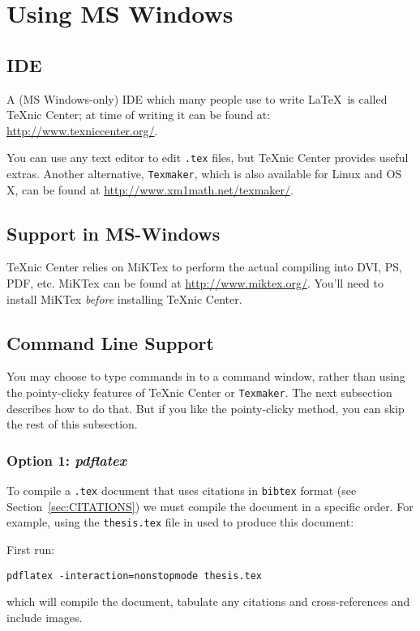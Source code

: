 \section{Using MS Windows}

\subsection{IDE}
A (MS Windows-only) IDE which many people use to write \LaTeX\ is
called TeXnic Center; at time of writing it can be found at:
\url{http://www.texniccenter.org/}.

You can use any text editor to edit \verb|.tex| files, but TeXnic Center
provides useful extras.
Another alternative, \verb|Texmaker|, which is also available for
Linux and OS X, can be found at \url{http://www.xm1math.net/texmaker/}.

\subsection{Support in MS-Windows}

TeXnic Center relies on MiKTex to perform the actual compiling
into DVI, PS, PDF, etc.  MiKTex can be found at
\url{http://www.miktex.org/}.
You'll need to install MiKTex \emph{before} installing TeXnic Center.

\subsection{Command Line Support}

You may choose to type commands in to a command window, rather than
using the pointy-clicky features of TeXnic Center or \verb|Texmaker|.
The next subsection describes how to do that.  But if you like the
pointy-clicky method, you can skip the rest of this subsection.

\subsubsection{Option 1: \emph{pdflatex}}

To compile a \verb|.tex| document that uses citations in \verb|bibtex|
format (see Section~\ref{sec:CITATIONS}) we must compile the document
in a specific order.  For example, using the \verb|thesis.tex| file in
used to produce this document:

First run:

\verb|pdflatex -interaction=nonstopmode thesis.tex|

\noindent which will compile the document, tabulate any
citations and cross-references and include images.

